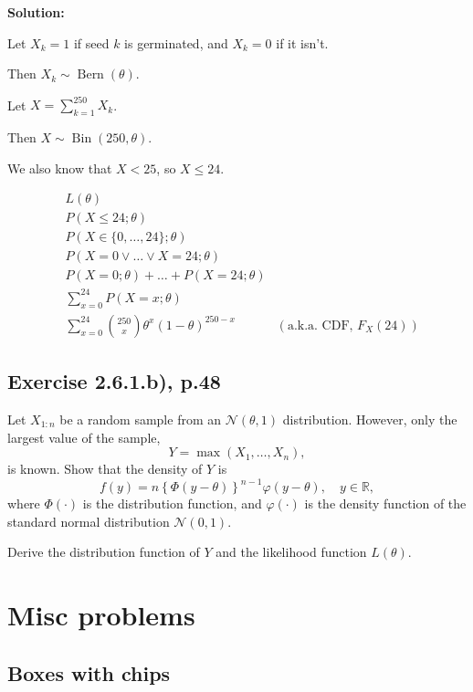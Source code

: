\documentclass{article}
\begin{document}
\textbf{Solution:}
\begin{ssolution}

Let \(X_k=1\) if seed \(k\) is germinated, and \(X_k=0\) if it isn't.

Then \(X_k \sim \operatorname{Bern}(\theta)\).

Let \(X=\sum_{k=1}^{250} X_k\).

Then \(X\sim \operatorname{Bin}(250, \theta)\).

We also know that \(X<25\), so \(X\leq 24\).

\begin{align*}
	& L(\theta) \\
	& P(X\leq 24;\theta) \\
	& P(X\in \{0,\ldots,24\};\theta) \\
	& P(X=0\vee\ldots\vee X=24;\theta) \\
	& P(X=0;\theta)+\ldots +P(X=24;\theta) \\
	& \sum_{x=0}^{24} P(X=x;\theta) \\
	& \sum_{x=0}^{24} \binom{250}{x} \theta^x (1-\theta)^{250-x} & (\text{a.k.a. CDF, }F_X(24))
\end{align*}
\end{ssolution}

\subsection{Exercise 2.6.1.b), p.48}

\begin{sproblem}
Let \( X_{1:n} \) be a random sample from an \( \mathcal{N}(\theta, 1) \) distribution.
However, only the largest value of the sample,
\[ Y = \max(X_1, \ldots, X_n), \]
is known. Show that the density of \( Y \) is
\[ f(y) = n \left\{ \Phi(y - \theta) \right\}^{n-1} \varphi(y - \theta), \quad y \in \mathbb{R}, \]
where \( \Phi(\cdot) \) is the distribution function, and \( \varphi(\cdot) \)
is the density function of the standard normal distribution \( \mathcal{N}(0, 1) \).

Derive the distribution function of \( Y \) and the likelihood function \( L(\theta) \).
\end{sproblem}

\section{Misc problems}
\subsection{Boxes with chips}
\end{document}
